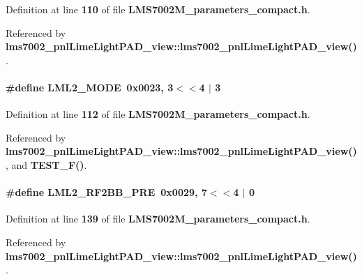 Definition at line {\bf 110} of file {\bf L\+M\+S7002\+M\+\_\+parameters\+\_\+compact.\+h}.



Referenced by {\bf lms7002\+\_\+pnl\+Lime\+Light\+P\+A\+D\+\_\+view\+::lms7002\+\_\+pnl\+Lime\+Light\+P\+A\+D\+\_\+view()}.

\paragraph[{L\+M\+L2\+\_\+\+M\+O\+DE}]{\setlength{\rightskip}{0pt plus 5cm}\#define L\+M\+L2\+\_\+\+M\+O\+DE~0x0023, 3$<$$<$4 $\vert$  3}\label{LMS7002M__parameters__compact_8h_aac2797a20cda61d5abc7b31c9e620d84}


Definition at line {\bf 112} of file {\bf L\+M\+S7002\+M\+\_\+parameters\+\_\+compact.\+h}.



Referenced by {\bf lms7002\+\_\+pnl\+Lime\+Light\+P\+A\+D\+\_\+view\+::lms7002\+\_\+pnl\+Lime\+Light\+P\+A\+D\+\_\+view()}, and {\bf T\+E\+S\+T\+\_\+\+F()}.

\paragraph[{L\+M\+L2\+\_\+\+R\+F2\+B\+B\+\_\+\+P\+RE}]{\setlength{\rightskip}{0pt plus 5cm}\#define L\+M\+L2\+\_\+\+R\+F2\+B\+B\+\_\+\+P\+RE~0x0029, 7$<$$<$4 $\vert$  0}\label{LMS7002M__parameters__compact_8h_a1978c25b33c0a48f6d2b627efa99b9a2}


Definition at line {\bf 139} of file {\bf L\+M\+S7002\+M\+\_\+parameters\+\_\+compact.\+h}.



Referenced by {\bf lms7002\+\_\+pnl\+Lime\+Light\+P\+A\+D\+\_\+view\+::lms7002\+\_\+pnl\+Lime\+Light\+P\+A\+D\+\_\+view()}.

